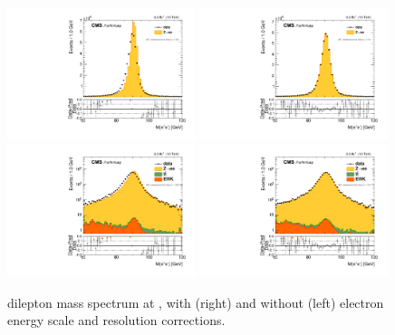 \begin{figure}[htbp]
\centering
\includegraphics[width=0.49\textwidth]{plots/LepScaleSmear/plotZee5TeV_noCorr/zee_norm.pdf}
\includegraphics[width=0.49\textwidth]{plots/LepScaleSmear/plotZee5TeV_corr/zee_norm.pdf}
\\
\includegraphics[width=0.49\textwidth]{plots/LepScaleSmear/plotZee5TeV_noCorr/zeelog_norm.pdf}
\includegraphics[width=0.49\textwidth]{plots/LepScaleSmear/plotZee5TeV_corr/zeelog_norm.pdf}
\caption{\zee dilepton mass spectrum at \sg, with (right) and without (left) electron energy scale and resolution corrections.}
\label{fig:lepscale:zee:5}
\end{figure}